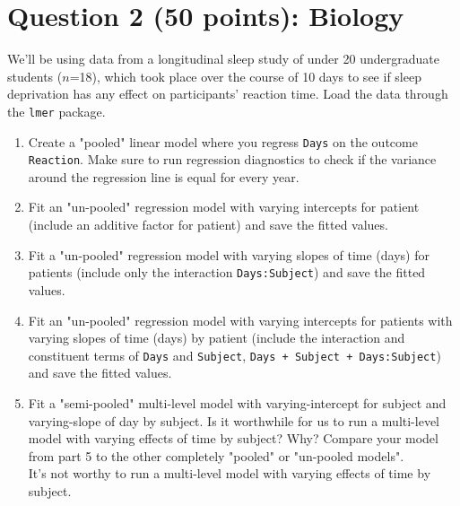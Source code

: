 \documentclass[12pt,letterpaper]{article}
\begin{document}
\section*{Question 2 (50 points): Biology}
\noindent We'll be using data from a longitudinal sleep study of under 20 undergraduate students ($n$=18), which took place over the course of 10 days to see if sleep deprivation has any effect on participants' reaction time. Load the data through the \texttt{lmer} package.

\begin{enumerate}
	\item
	Create a "pooled" linear model where you regress \texttt{Days} on the outcome \texttt{Reaction}. Make sure to run regression diagnostics to check if the variance around the regression line is equal for every year.\\
		 
	
	\item Fit an "un-pooled" regression model with varying intercepts for patient (include an additive factor for patient) and save the fitted values.
		 
	\item Fit a "un-pooled" regression model with varying slopes of time (days) for patients (include only the interaction \texttt{Days:Subject}) and save the fitted values.
		 
	\item Fit an "un-pooled" regression model with varying intercepts for patients with varying slopes of time (days) by patient (include the interaction and constituent terms of \texttt{Days} and \texttt{Subject}, \texttt{Days + Subject + Days:Subject}) and save the fitted values.
		 
	\item Fit a "semi-pooled" multi-level model with varying-intercept for subject and varying-slope of day by subject. Is it worthwhile for us to run a multi-level model with varying effects of time by subject? Why? Compare your model from part 5 to the other completely "pooled" or "un-pooled models".\\
	
	It's not worthy to run a multi-level model with varying effects of time by subject.

\end{enumerate}
\end{document}

